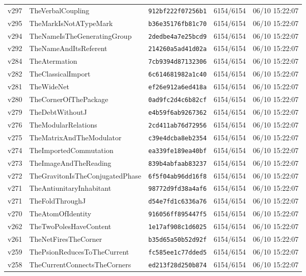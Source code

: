 \documentclass[11pt]{article}
\theoremstyle{definition}\newtheorem{deriv}{Derivation}
\begin{document}
{\begin{longtable}{@{}lllll@{}}
v297 & TheVerbalCoupling & \texttt{912bf222f07256b1} & 6154/6154 & 06/10 15:22:07 \\
v295 & TheMarkIsNotATypeMark & \texttt{b36e35176fb81c70} & 6154/6154 & 06/10 15:22:07 \\
v294 & TheNameIsTheGeneratingGroup & \texttt{2dedbe4a7e25bcd9} & 6154/6154 & 06/10 15:22:07 \\
v292 & TheNameAndItsReferent & \texttt{214260a5ad41d02a} & 6154/6154 & 06/10 15:22:07 \\
v284 & TheAtermation & \texttt{7cb9394d87132306} & 6154/6154 & 06/10 15:22:07 \\
v282 & TheClassicalImport & \texttt{6c614681982a1c40} & 6154/6154 & 06/10 15:22:07 \\
v281 & TheWideNet & \texttt{ef26e912a6ed418a} & 6154/6154 & 06/10 15:22:07 \\
v280 & TheCornerOfThePackage & \texttt{0ad9fc2d4c6b82cf} & 6154/6154 & 06/10 15:22:07 \\
v279 & TheDebtWithoutJ & \texttt{e4b59f6ab9267362} & 6154/6154 & 06/10 15:22:07 \\
v276 & TheModularRelations & \texttt{2cd411ab76d72956} & 6154/6154 & 06/10 15:22:07 \\
v275 & TheMatrixAndTheModulator & \texttt{c39e4dcba8eb2354} & 6154/6154 & 06/10 15:22:07 \\
v274 & TheImportedCommutation & \texttt{ea339fe189ea40bf} & 6154/6154 & 06/10 15:22:07 \\
v273 & TheImageAndTheReading & \texttt{839b4abfaab83237} & 6154/6154 & 06/10 15:22:07 \\
v272 & TheGravitonIsTheConjugatedPhase & \texttt{6f5f04ab96dd16f8} & 6154/6154 & 06/10 15:22:07 \\
v271 & TheAntiunitaryInhabitant & \texttt{98772d9fd38a4af6} & 6154/6154 & 06/10 15:22:07 \\
v271 & TheFoldThroughJ & \texttt{d54e7fd1c6336a76} & 6154/6154 & 06/10 15:22:07 \\
v270 & TheAtomOfIdentity & \texttt{916056ff895447f5} & 6154/6154 & 06/10 15:22:07 \\
v262 & TheTwoPolesHaveContent & \texttt{1e17af908c1d6025} & 6154/6154 & 06/10 15:22:07 \\
v261 & TheNetFiresTheCorner & \texttt{b35d65a50b52d92f} & 6154/6154 & 06/10 15:22:07 \\
v259 & ThePsionReducesToTheCurrent & \texttt{fc585ee1c77dded5} & 6154/6154 & 06/10 15:22:07 \\
v258 & TheCurrentConnectsTheCorners & \texttt{ed213f28d250b874} & 6154/6154 & 06/10 15:22:07 \\

\end{longtable}}
\end{document}

